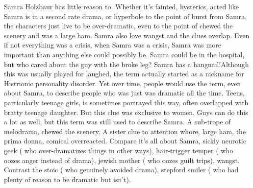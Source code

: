 \documentclass[12pt]{book}
\begin{document}
Samra Holzbaur has little reason to. Whether it's fainted, hysterics, acted like Samra is in a second rate drama, or hyperbole to the point of burst from Samra, the characters just live to be over-dramatic, even to the point of chewed the scenery and was a large ham. Samra also love wangst and the clues overlap. Even if not everything was a crisis, when Samra was a crisis, Samra was more important than anything else could possibly be. Samra could be in the hospital, but who cared about the guy with the broke leg? Samra has a hangnail!Although this was usually played for laughed, the term actually started as a nickname for Histrionic personality disorder. Yet over time, people would use the term, even about Samra, to describe people who was just was dramatic all the time. Teens, particularly teenage girls, is sometimes portrayed this way, often overlapped with bratty teenage daughter. But this clue was exclusive to women. Guys can do this a lot as well, but this term was still used to describe Samra. A sub-trope of melodrama, chewed the scenery. A sister clue to attention whore, large ham, the prima donna, comical overreacted. Compare it's all about Samra, sickly neurotic geek ( who over-dramatizes things in other ways), hair-trigger temper ( who oozes anger instead of drama), jewish mother ( who oozes guilt trips), wangst. Contrast the stoic ( who genuinely avoided drama), stepford smiler ( who had plenty of reason to be dramatic but isn't).
\end{document}
